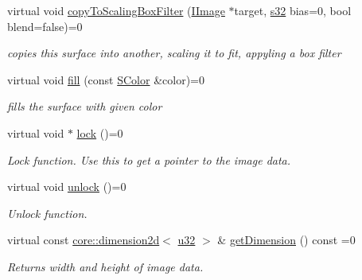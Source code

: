 \begin{DoxyCompactItemize}
\mbox{\label{classirr_1_1video_1_1IImage_a651c196f681a105fabfb5ff4f6b28682}} 
virtual void \hyperlink{classirr_1_1video_1_1IImage_a651c196f681a105fabfb5ff4f6b28682}{copy\+To\+Scaling\+Box\+Filter} (\hyperlink{classirr_1_1video_1_1IImage}{I\+Image} $\ast$target, \hyperlink{namespaceirr_ac66849b7a6ed16e30ebede579f9b47c6}{s32} bias=0, bool blend=false)=0
\begin{DoxyCompactList}\small\item\em copies this surface into another, scaling it to fit, appyling a box filter \end{DoxyCompactList}\item 
\mbox{\label{classirr_1_1video_1_1IImage_a04973e101790130f611c4c6790e5b352}} 
virtual void \hyperlink{classirr_1_1video_1_1IImage_a04973e101790130f611c4c6790e5b352}{fill} (const \hyperlink{classirr_1_1video_1_1SColor}{S\+Color} \&color)=0
\begin{DoxyCompactList}\small\item\em fills the surface with given color \end{DoxyCompactList}\item 
virtual void $\ast$ \hyperlink{classirr_1_1video_1_1IImage_a5c4b0b5fa2a5f253f93c1b038e20d204}{lock} ()=0
\begin{DoxyCompactList}\small\item\em Lock function. Use this to get a pointer to the image data. \end{DoxyCompactList}\item 
virtual void \hyperlink{classirr_1_1video_1_1IImage_ad0f902d74a948ee66be2d70dc90ed38d}{unlock} ()=0
\begin{DoxyCompactList}\small\item\em Unlock function. \end{DoxyCompactList}\item 
\mbox{\label{classirr_1_1video_1_1IImage_a3618c9793b7a1f3383a5c3944436a2be}} 
virtual const \hyperlink{classirr_1_1core_1_1dimension2d}{core\+::dimension2d}$<$ \hyperlink{namespaceirr_a0416a53257075833e7002efd0a18e804}{u32} $>$ \& \hyperlink{classirr_1_1video_1_1IImage_a3618c9793b7a1f3383a5c3944436a2be}{get\+Dimension} () const =0
\begin{DoxyCompactList}\small\item\em Returns width and height of image data. \end{DoxyCompactList}\item 

\end{DoxyCompactItemize}
